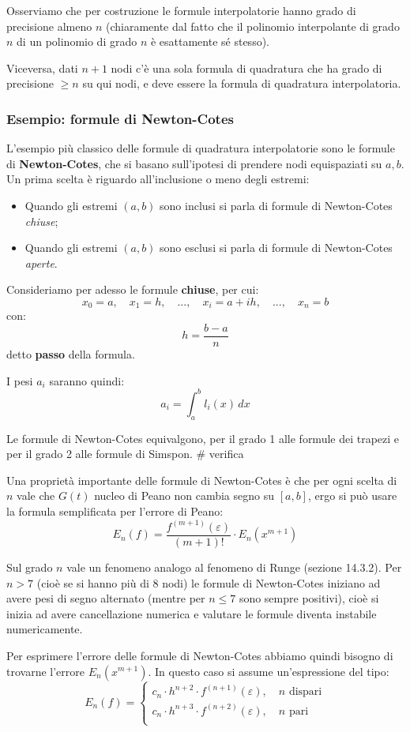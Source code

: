 \documentclass[a4paper,11pt]{article}
\begin{document}
Osserviamo che per costruzione le formule interpolatorie hanno grado di precisione almeno $n$ (chiaramente dal fatto che il polinomio interpolante di grado $n$ di un polinomio di grado $n$ è esattamente sé stesso).

Viceversa, dati $n + 1$ nodi c'è una sola formula di quadratura che ha grado di precisione $\geq n$ su qui nodi, e deve essere la formula di quadratura interpolatoria.

\subsubsection{Esempio: formule di Newton-Cotes}
L'esempio più classico delle formule di quadratura interpolatorie sono le formule di \textbf{Newton-Cotes}, che si basano sull'ipotesi di prendere nodi equispaziati su $a, b$.
Un prima scelta è riguardo all'inclusione o meno degli estremi:
\begin{itemize}
	\item Quando gli estremi $(a, b)$ sono inclusi si parla di formule di Newton-Cotes \textit{chiuse};
	\item Quando gli estremi $(a, b)$ sono esclusi si parla di formule di Newton-Cotes \textit{aperte}.
\end{itemize}

Consideriamo per adesso le formule \textbf{chiuse}, per cui:
$$
x_0 = a, \quad x_1 = h, \quad ..., \quad x_i = a + ih, \quad ..., \quad x_n = b
$$
con:
$$
h = \frac{b - a}{n}
$$
detto \textbf{passo} della formula.

I pesi $a_i$ saranno quindi:
$$
a_i = \int_a^b l_i(x) \, dx
$$

Le formule di Newton-Cotes equivalgono, per il grado 1 alle formule dei trapezi e per il grado 2 alle formule di Simspon. # verifica

Una proprietà importante delle formule di Newton-Cotes è che per ogni scelta di $n$ vale che $G(t)$ nucleo di Peano non cambia segno su $[a ,b]$, ergo si può usare la formula semplificata per l'errore di Peano:
$$
E_n(f) = \frac{f^{(m + 1)} (\varepsilon)}{(m + 1)!} \cdot E_n(x^{m + 1})
$$

Sul grado $n$ vale un fenomeno analogo al fenomeno di Runge (sezione 14.3.2).
Per $n > 7$ (cioè se si hanno più di $8$ nodi) le formule di Newton-Cotes iniziano ad avere pesi di segno alternato (mentre per $n \leq 7$ sono sempre positivi), cioè si inizia ad avere cancellazione numerica e valutare le formule diventa instabile numericamente.

Per esprimere l'errore delle formule di Newton-Cotes abbiamo quindi bisogno di trovarne l'errore $E_n(x^{m + 1})$.
In questo caso si assume un'espressione del tipo:
$$
E_n(f) =
\begin{cases}
	c_n \cdot h^{n + 2} \cdot f^{(n + 1)} (\varepsilon), \quad n \text{ dispari} \\			
	c_n \cdot h^{n + 3} \cdot f^{(n + 2)} (\varepsilon), \quad n \text{ pari} \\			
\end{cases}
$$
\end{document}
